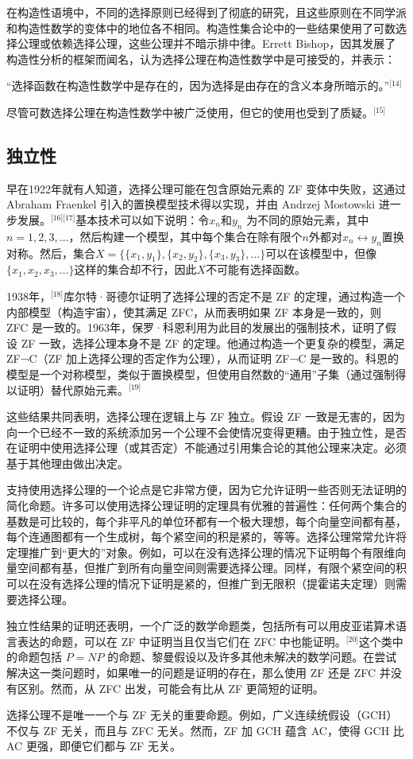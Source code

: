 在构造性语境中，不同的选择原则已经得到了彻底的研究，且这些原则在不同学派和构造性数学的变体中的地位各不相同。构造性集合论中的一些结果使用了可数选择公理或依赖选择公理，这些公理并不暗示排中律。Errett Bishop，因其发展了构造性分析的框架而闻名，认为选择公理在构造性数学中是可接受的，并表示：

“选择函数在构造性数学中是存在的，因为选择是由存在的含义本身所暗示的。”\(^\text{[14]}\)

尽管可数选择公理在构造性数学中被广泛使用，但它的使用也受到了质疑。\(^\text{[15]}\)
\subsection{独立性}  
早在1922年就有人知道，选择公理可能在包含原始元素的 ZF 变体中失败，这通过 Abraham Fraenkel 引入的置换模型技术得以实现，并由 Andrzej Mostowski 进一步发展。\(^\text{[16][17]}\)基本技术可以如下说明：令\(x_n\)和\(y_n\) 为不同的原始元素，其中\(n = 1, 2, 3, \dots\)，然后构建一个模型，其中每个集合在除有限个\(n\)外都对\(x_n \leftrightarrow y_n\)置换对称。然后，集合\(X = \{\{x_1, y_1\}, \{x_2, y_2\}, \{x_3, y_3\}, \dots\}\)可以在该模型中，但像\(\{x_1, x_2, x_3, \dots\}\)这样的集合却不行，因此\(X\)不可能有选择函数。

1938年，\(^\text{[18]}\)库尔特·哥德尔证明了选择公理的否定不是 ZF 的定理，通过构造一个内部模型（构造宇宙），使其满足 ZFC，从而表明如果 ZF 本身是一致的，则 ZFC 是一致的。1963年，保罗·科恩利用为此目的发展出的强制技术，证明了假设 ZF 一致，选择公理本身不是 ZF 的定理。他通过构造一个更复杂的模型，满足 ZF¬C（ZF 加上选择公理的否定作为公理），从而证明 ZF¬C 是一致的。科恩的模型是一个对称模型，类似于置换模型，但使用自然数的“通用”子集（通过强制得以证明）替代原始元素。\(^\text{[19]}\)

这些结果共同表明，选择公理在逻辑上与 ZF 独立。假设 ZF 一致是无害的，因为向一个已经不一致的系统添加另一个公理不会使情况变得更糟。由于独立性，是否在证明中使用选择公理（或其否定）不能通过引用集合论的其他公理来决定。必须基于其他理由做出决定。

支持使用选择公理的一个论点是它非常方便，因为它允许证明一些否则无法证明的简化命题。许多可以使用选择公理证明的定理具有优雅的普遍性：任何两个集合的基数是可比较的，每个非平凡的单位环都有一个极大理想，每个向量空间都有基，每个连通图都有一个生成树，每个紧空间的积是紧的，等等。选择公理常常允许将定理推广到“更大的”对象。例如，可以在没有选择公理的情况下证明每个有限维向量空间都有基，但推广到所有向量空间则需要选择公理。同样，有限个紧空间的积可以在没有选择公理的情况下证明是紧的，但推广到无限积（提霍诺夫定理）则需要选择公理。

独立性结果的证明还表明，一个广泛的数学命题类，包括所有可以用皮亚诺算术语言表达的命题，可以在 ZF 中证明当且仅当它们在 ZFC 中也能证明。\(^\text{[20]}\)这个类中的命题包括 \(P = NP\) 的命题、黎曼假设以及许多其他未解决的数学问题。在尝试解决这一类问题时，如果唯一的问题是证明的存在，那么使用 ZF 还是 ZFC 并没有区别。然而，从 ZFC 出发，可能会有比从 ZF 更简短的证明。

选择公理不是唯一一个与 ZF 无关的重要命题。例如，广义连续统假设（GCH）不仅与 ZF 无关，而且与 ZFC 无关。然而，ZF 加 GCH 蕴含 AC，使得 GCH 比 AC 更强，即便它们都与 ZF 无关。
